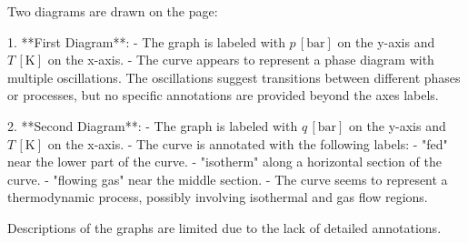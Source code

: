 Two diagrams are drawn on the page:

1. **First Diagram**:  
   - The graph is labeled with \( p \, [\text{bar}] \) on the y-axis and \( T \, [\text{K}] \) on the x-axis.  
   - The curve appears to represent a phase diagram with multiple oscillations. The oscillations suggest transitions between different phases or processes, but no specific annotations are provided beyond the axes labels.

2. **Second Diagram**:  
   - The graph is labeled with \( q \, [\text{bar}] \) on the y-axis and \( T \, [\text{K}] \) on the x-axis.  
   - The curve is annotated with the following labels:  
     - "fed" near the lower part of the curve.  
     - "isotherm" along a horizontal section of the curve.  
     - "flowing gas" near the middle section.  
   - The curve seems to represent a thermodynamic process, possibly involving isothermal and gas flow regions.  

Descriptions of the graphs are limited due to the lack of detailed annotations.